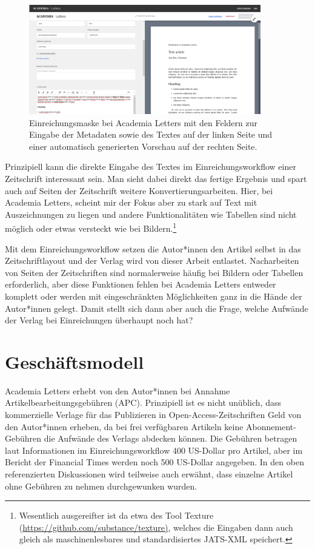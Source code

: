 \documentclass[a4paper,
fontsize=11pt,
oneside,
numbers=noperiodatend,
parskip=half-,
bibliography=totoc,
final
]{scrartcl}
\begin{document}
\begin{figure}
\centering
\includegraphics[width=0.9\textwidth]{img/abb2.png}
\caption{Einreichungsmaske bei Academia Letters mit den Feldern zur
Eingabe der Metadaten sowie des Textes auf der linken Seite und einer
automatisch generierten Vorschau auf der rechten Seite.}
\end{figure}

Prinzipiell kann die direkte Eingabe des Textes im Einreichungsworkflow
einer Zeitschrift interessant sein. Man sieht dabei direkt das fertige
Ergebnis und spart auch auf Seiten der Zeitschrift weitere
Konvertierungsarbeiten. Hier, bei Academia Letters, scheint mir der
Fokus aber zu stark auf Text mit Auszeichnungen zu liegen und andere
Funktionalitäten wie Tabellen sind nicht möglich oder etwas versteckt
wie bei Bildern.\footnote{Wesentlich ausgereifter ist da etwa des Tool
  Texture
  (\href{https://github.com/substance/texture}{https://github.com/substance/texture)},
  welches die Eingaben dann auch gleich als maschinenlesbares und
  standardisiertes JATS-XML speichert.}

Mit dem Einreichungsworkflow setzen die Autor*innen den Artikel selbst
in das Zeitschriftlayout und der Verlag wird von dieser Arbeit
entlastet. Nacharbeiten von Seiten der Zeitschriften sind normalerweise
häufig bei Bildern oder Tabellen erforderlich, aber diese Funktionen
fehlen bei Academia Letters entweder komplett oder werden mit
eingeschränkten Möglichkeiten ganz in die Hände der Autor*innen gelegt.
Damit stellt sich dann aber auch die Frage, welche Aufwände der Verlag
bei Einreichungen überhaupt noch hat?

\hypertarget{geschuxe4ftsmodell}{%
\section{Geschäftsmodell}\label{geschuxe4ftsmodell}}

Academia Letters erhebt von den Autor*innen bei Annahme
Artikelbearbeitungsgebühren (APC). Prinzipiell ist es nicht unüblich,
dass kommerzielle Verlage für das Publizieren in
Open-Access-Zeitschriften Geld von den Autor*innen erheben, da bei frei
verfügbaren Artikeln keine Abonne\-ment-Gebühren die Aufwände des Verlags
abdecken können. Die Gebühren betragen laut Informationen im
Einreichungsworkflow 400 US-Dollar pro Artikel, aber im Bericht der
Financial Times werden noch 500 US-Dollar angegeben. In den oben
referenzierten Diskussionen wird teilweise auch erwähnt, dass einzelne
Artikel ohne Gebühren zu nehmen durchgewunken wurden.
\end{document}
